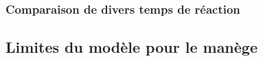 \documentclass[slidetop,11pt]{beamer}
\begin{document}
\begin{frame}
	\frametitle{Comparaison de divers temps de réaction}
	\begin{figure}
		\begin{center}
		\end{center}
	\end{figure}
\end{frame}

	

	\subsection{Limites du modèle pour le manège}
	
\end{document}
